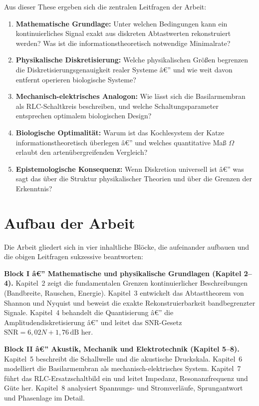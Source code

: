 ﻿\documentclass[12pt,a4paper,titlepage]{report}
\begin{document}
Aus dieser These ergeben sich die zentralen Leitfragen der Arbeit:

\begin{enumerate}[leftmargin=2em, label=\textbf{F\arabic*.}]
	\item \textbf{Mathematische Grundlage:}
		Unter welchen Bedingungen kann ein kontinuierliches Signal
		exakt aus diskreten Abtastwerten rekonstruiert werden?
		Was ist die informationstheoretisch notwendige Minimalrate?
	\item \textbf{Physikalische Diskretisierung:}
		Welche physikalischen Größen begrenzen die Diskretisierungsgenauigkeit
		realer Systeme â€” und wie weit davon entfernt operieren
		biologische Systeme?
	\item \textbf{Mechanisch-elektrisches Analogon:}
		Wie lässt sich die Basilarmembran als RLC-Schaltkreis
		beschreiben, und welche Schaltungsparameter entsprechen
		optimalem biologischen Design?
	\item \textbf{Biologische Optimalität:}
		Warum ist das Kochlesystem der Katze informationstheoretisch
		überlegen â€” und welches quantitative Maß $\Omega$ erlaubt
		den artenübergreifenden Vergleich?
	\item \textbf{Epistemologische Konsequenz:}
		Wenn Diskretion universell ist â€” was sagt das über die Struktur
		physikalischer Theorien und über die Grenzen der Erkenntnis?
\end{enumerate}

\section{Aufbau der Arbeit}

Die Arbeit gliedert sich in vier inhaltliche Blöcke, die aufeinander aufbauen
und die obigen Leitfragen sukzessive beantworten:

\medskip
\noindent\textbf{Block I â€” Mathematische und physikalische Grundlagen
(Kapitel 2--4).}
Kapitel~2 zeigt die fundamentalen Grenzen kontinuierlicher Beschreibungen
(Bandbreite, Rauschen, Energie).
Kapitel~3 entwickelt das Abtasttheorem von Shannon und Nyquist und beweist
die exakte Rekonstruierbarkeit bandbegrenzter Signale.
Kapitel~4 behandelt die Quantisierung â€” die Amplitudendiskretisierung â€”
und leitet das SNR-Gesetz $\mathrm{SNR} = 6{,}02N + 1{,}76\,\mathrm{dB}$
her.

\medskip
\noindent\textbf{Block II â€” Akustik, Mechanik und Elektrotechnik
(Kapitel 5--8).}
Kapitel~5 beschreibt die Schallwelle und die akustische Druckskala.
Kapitel~6 modelliert die Basilarmembran als mechanisch-elektrisches System.
Kapitel~7 führt das RLC-Ersatzschaltbild ein und leitet Impedanz,
Resonanzfrequenz und Güte her.
Kapitel~8 analysiert Spannungs- und Stromverläufe, Sprungantwort und
Phasenlage im Detail.
\end{document}
